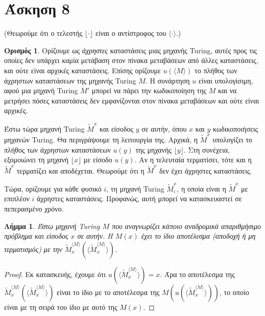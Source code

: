 \documentclass[a4paper, oneside, 11pt]{article}
\newtheorem{lm}[thm]{Λήμμα}
\theoremstyle{definition}
\newtheorem{defn}[thm]{Ορισμός}
\begin{document}
\section*{Άσκηση 8}

(Θεωρούμε ότι ο τελεστής $\lfloor\cdot\rfloor$ είναι ο αντίστροφος του $\langle\cdot\rangle$.)

\begin{defn}
Ορίζουμε ως \textit{άχρηστες} καταστάσεις μιας μηχανής Turing, αυτές προς τις οποίες δεν υπάρχει καμία
μετάβαση στον πίνακα μεταβάσεων από άλλες καταστάσεις, 
και ούτε είναι αρχικές καταστάσεις. Επίσης ορίζουμε $u(\langle M\rangle)$ 
το πλήθος των άχρηστων καταστάσεων της μηχανής Turing $M$. Η συνάρτηση $u$ είναι υπολογίσιμη, αφού μια μηχανή
Turing $M'$ μπορεί να πάρει την κωδικοποίηση της $M$ και να μετρήσει πόσες καταστάσεις δεν εμφανίζονται στον
πίνακα μεταβάσεων και ούτε είναι αρχικές.
\end{defn}


Έστω τώρα μηχανή Turing $\widetilde{M}^x$ και είσοδος $y$ σε αυτήν, όπου $x$ και $y$ κωδικοποιήσεις μηχανών
Turing. Θα περιγράψουμε τη λειτουργία της.
Αρχικά, η $\widetilde{M}^x$ υπολογίζει το πλήθος των άχρηστων καταστάσεων $u(y)$ της μηχανής $\lfloor y\rfloor$.
Στη συνέχεια, εξομοιώνει τη μηχανή $\lfloor x\rfloor$ με είσοδο $u(y)$. Αν η τελευταία τερματίσει, τότε και η
$\widetilde{M}^x$ τερματίζει και αποδέχεται. Θεωρούμε ότι η
$\widetilde{M}^x$ δεν έχει άχρηστες καταστάσεις.

Τώρα, ορίζουμε για κάθε φυσικό $i$, τη μηχανή Turing $\widetilde{M}_i^x$, η οποία είναι η $\widetilde{M}^x$
με επιπλέον $i$ άχρηστες καταστάσεις. Προφανώς, αυτή μπορεί να κατασκευαστεί σε πεπερασμένο
χρόνο.

\begin{lm}
Έστω μηχανή Turing $M$ που αναγνωρίζει κάποιο αναδρομικά απαριθμήσιμο πρόβλημα και είσοδος $x$ σε αυτήν. 
Η $M(x)$ έχει το ίδιο αποτέλεσμα (αποδοχή ή μη τερματισμός) με την
$\widetilde{M}_x^{\langle M\rangle}(\langle\widetilde{M}_x^{\langle M\rangle}\rangle)$.
\end{lm}
\begin{proof}
Εκ κατασκευής, έχουμε ότι $u(\langle\widetilde{M}_x^{\langle M\rangle}\rangle)=x$. Άρα το αποτέλεσμα
της $\widetilde{M}_x^{\langle M\rangle}(\langle\widetilde{M}_x^{\langle M\rangle}\rangle)$ είναι το ίδιο με το
αποτέλεσμα της $M(u(\langle\widetilde{M}_x^{\langle M\rangle}\rangle))$, το οποίο 
είναι με τη σειρά του ίδιο με αυτό της $M(x)$.
\end{proof}
\end{document}
